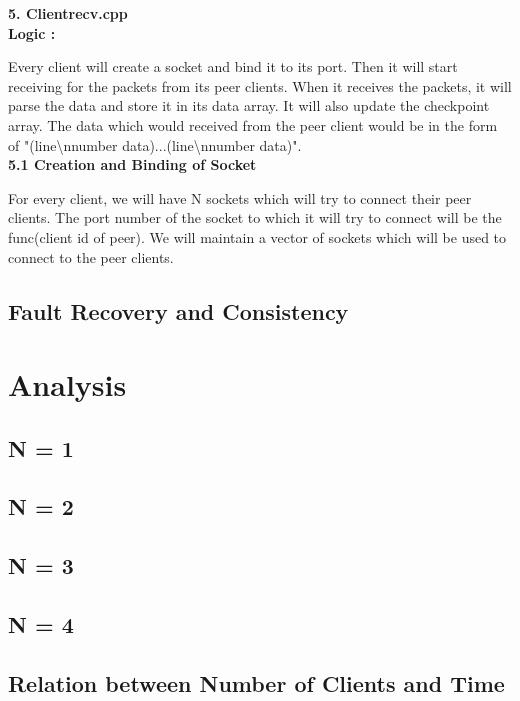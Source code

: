 \documentclass[12pt]{scrartcl}
\begin{document}
\textbf{5. Clientrecv.cpp}\\
\textbf{Logic : }
\par Every client will create a socket and bind it to its port. Then it will start receiving for the packets from its peer clients. When it receives the packets, it will parse the data and store it in its data array. It will also update the checkpoint array. The data which would received from the peer client would be in the form of "(line\textbackslash nnumber data)...(line\textbackslash nnumber data)".\\
\textbf{5.1 Creation and Binding of Socket}
\par For every client, we will have N sockets which will try to connect their peer clients. The port number of the socket to which it will try to connect will be the func(client id of peer). We will maintain a vector of sockets which will be used to connect to the peer clients.\\




\subsection{Fault Recovery and Consistency}
\section{Analysis}
\subsection{N = 1}
\subsection{N = 2}
\subsection{N = 3}
\subsection{N = 4}
\subsection{Relation between Number of Clients and Time}
\end{document}
